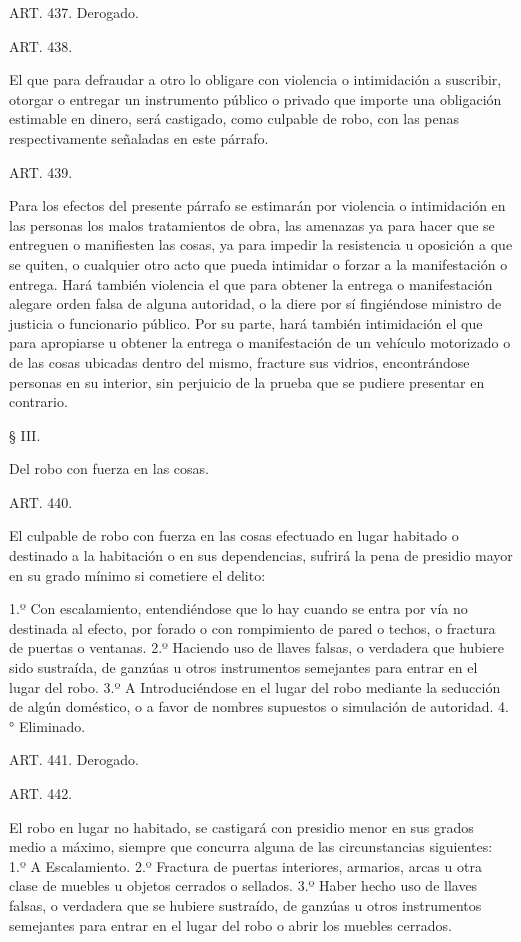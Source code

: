     ART. 437.    Derogado.


    ART. 438.

    El que para defraudar a otro lo obligare con violencia o intimidación a suscribir, otorgar o entregar un instrumento público o privado que importe una obligación estimable en dinero, será castigado, como culpable de robo, con las penas respectivamente señaladas en este párrafo.



    ART. 439.

    Para los efectos del presente párrafo se estimarán por violencia o intimidación en las personas los malos tratamientos de obra, las amenazas ya para hacer que se entreguen o manifiesten las cosas, ya para impedir la resistencia u oposición a que se quiten, o cualquier otro acto que pueda intimidar o forzar a la manifestación o entrega. Hará también violencia el que para obtener la entrega o manifestación alegare orden falsa de alguna autoridad, o la diere por sí fingiéndose ministro de justicia o funcionario público. Por su parte, hará también intimidación el que para apropiarse u obtener la entrega o manifestación de un vehículo motorizado o de las cosas ubicadas dentro del mismo, fracture sus vidrios, encontrándose personas en su interior, sin perjuicio de la prueba que se pudiere presentar en contrario.

    § III.

    Del robo con fuerza en las cosas.


    ART. 440.

    El culpable de robo con fuerza en las cosas efectuado en lugar habitado o destinado a la habitación o en sus dependencias, sufrirá la pena de presidio mayor en su grado mínimo si cometiere el delito:

    1.º Con escalamiento, entendiéndose que lo hay cuando se entra por vía no destinada al efecto, por forado o con rompimiento de pared o techos, o fractura de puertas o ventanas.
    2.º Haciendo uso de llaves falsas, o verdadera que hubiere sido sustraída, de ganzúas u otros instrumentos semejantes para entrar en el lugar del robo.
    3.º A Introduciéndose en el lugar del robo mediante la seducción de algún doméstico, o a favor de nombres supuestos o simulación de autoridad.
    4.° Eliminado.

    ART. 441.    Derogado.


    ART. 442.

    El robo en lugar no habitado, se castigará con presidio menor en sus grados medio a máximo, siempre que concurra alguna de las circunstancias siguientes:
    1.º A Escalamiento.
    2.º Fractura de puertas interiores, armarios, arcas u otra clase de muebles u objetos cerrados o sellados.
    3.º Haber hecho uso de llaves falsas, o verdadera que se hubiere sustraído, de ganzúas u otros instrumentos semejantes para entrar en el lugar del robo o abrir los muebles cerrados.


